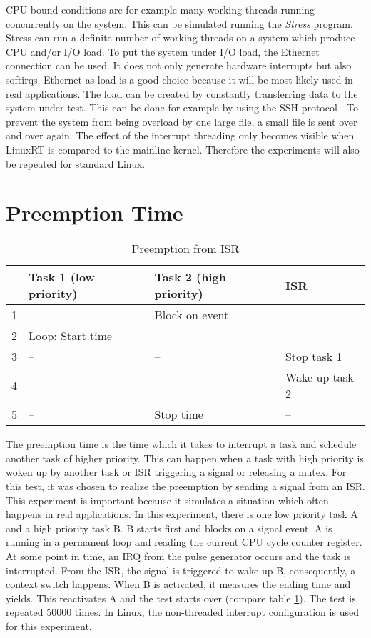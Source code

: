 \ac{CPU} bound conditions are for example many working threads running concurrently on the system.
This can be simulated running the \textit{Stress} \cite{stress} program.
Stress can run a definite number of working threads on a system which produce \ac{CPU} and/or \ac{I/O} load.
To put the system under \ac{I/O} load, the Ethernet connection can be used.
It does not only generate hardware interrupts but also softirqs.
Ethernet as load is a good choice because it will be most likely used in real applications.
The load can be created by constantly transferring data to the system under test.
This can be done for example by using the \ac{SSH} protocol \cite{tlip:tsspa}.
To prevent the system from being overload by one large file, a small file is sent over and over again. 
The effect of the interrupt threading only becomes visible when LinuxRT is compared to the mainline kernel.
Therefore the experiments will also be repeated for standard Linux.

\section{Preemption Time}
\begin{table}[htbp]
	\centering
		\begin{tabular}{|l|l|l|l|}
			\hline
				& Task 1 (low priority)& Task 2 (high priority)	& \ac{ISR}				\\
				\hline 
				1 & --									 & Block on event					& --							\\
			  2 & Loop: Start time		 & --											& --							\\
			  3 & --									 & --											& Stop task 1			\\
			  4 & --									 & --							 				& Wake up task 2	\\
			  5 & --									 & Stop time							& --							\\	  
			\hline
		\end{tabular}
	\caption{Preemption from ISR}
	\label{tab_preemption}
\end{table}

The preemption time is the time which it takes to interrupt a task and schedule another task of higher priority.
This can happen when a task with high priority is woken up by another task or \ac{ISR} triggering a signal or releasing a mutex.
For this test, it was chosen to realize the preemption by sending a signal from an \ac{ISR}.
This experiment is important because it simulates a situation which often happens in real applications.
In this experiment, there is one low priority task A and a high priority task B.
B starts first and blocks on a signal event.
A is running in a permanent loop and reading the current \ac{CPU} cycle counter register.
At some point in time, an \ac{IRQ} from the pulse generator occurs and the task is interrupted.
From the \ac{ISR}, the signal is triggered to wake up B, consequently, a context switch happens.
When B is activated, it measures the ending time and yields.
This reactivates A and the test starts over (compare table \ref{tab_preemption}).
The test is repeated 50000 times.
In Linux, the non-threaded interrupt configuration is used for this experiment. 

